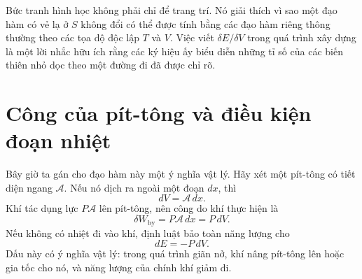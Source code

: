 Bức tranh hình học không phải chỉ để trang trí. Nó giải thích vì sao một đạo hàm có vẻ lạ ở \(S\) không đổi có thể được tính bằng các đạo hàm riêng thông thường theo các tọa độ độc lập \(T\) và \(V\). Việc viết \(\delta E/\delta V\) trong quá trình xây dựng là một lời nhắc hữu ích rằng các ký hiệu ấy biểu diễn những tỉ số của các biến thiên nhỏ dọc theo một đường đi đã được chỉ rõ.

\begin{classroomqa}
\end{classroomqa}

\begin{classroomqa}
\end{classroomqa}

\section{Công của pít-tông và điều kiện đoạn nhiệt}

Bây giờ ta gán cho đạo hàm này một ý nghĩa vật lý. Hãy xét một pít-tông có
tiết diện ngang \(\mathcal A\). Nếu nó dịch ra ngoài một đoạn \(dx\), thì
\begin{equation}
 dV=\mathcal A\,dx.
 \label{eq:sm5-piston-volume}
\end{equation}
Khí tác dụng lực \(P\mathcal A\) lên pít-tông, nên công do khí thực hiện là
\begin{equation}
 \delta W_{\mathrm{by}}=P\mathcal A\,dx=P\,dV.
 \label{eq:sm5-piston-work}
\end{equation}
Nếu không có nhiệt đi vào khí, định luật bảo toàn năng lượng cho
\begin{equation}
 dE=-P\,dV.
 \label{eq:sm5-adiabatic-work}
\end{equation}
Dấu này có ý nghĩa vật lý: trong quá trình giãn nở, khí nâng pít-tông lên hoặc gia tốc cho nó, và năng lượng của chính khí giảm đi.

